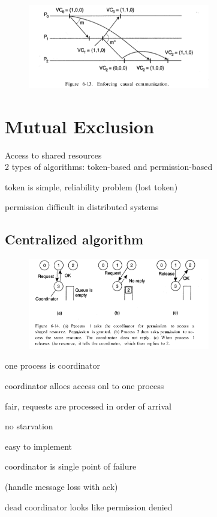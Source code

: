 \documentclass[ngerman,a4paper]{report}
\begin{document}
\begin{figure}[h]
	\centering
	\includegraphics[width=300px]{gfx/vector-clock.png}
	\label{img:vector-clock}
\end{figure}


\chapter{Mutual Exclusion}
Access to shared resources\\
2 types of algorithms: token-based and permission-based
\begin{compactitem}
	\item token is simple, reliability problem (lost token)
	\item permission difficult in distributed systems
\end{compactitem}

\section{Centralized algorithm}
\begin{figure}[h]
	\centering
	\includegraphics[width=300px]{gfx/mutex-centralized.png}
	\label{img:mutex-centralized}
\end{figure}

\begin{compactitem}
	\item one process is coordinator
	\item coordinator alloes access onl to one process
	\item fair, requests are processed in order of arrival
	\item no starvation
	\item easy to implement
	\item coordinator is single point of failure
	\item (handle message loss with ack)
	\item dead coordinator looks like permission denied
\end{compactitem}
\end{document}
